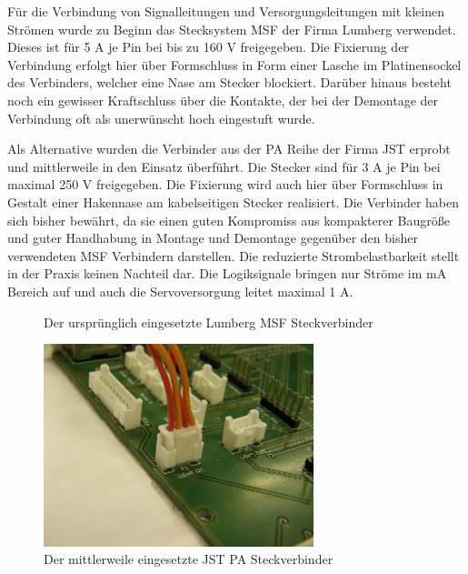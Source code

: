 Für die Verbindung von Signalleitungen  und Versorgungsleitungen mit kleinen Strömen wurde zu Beginn das Stecksystem MSF der Firma Lumberg verwendet.
Dieses ist für 5 A je Pin bei bis zu 160 V freigegeben. Die Fixierung der Verbindung erfolgt hier über Formschluss in Form einer Lasche im Platinensockel des Verbinders, welcher eine Nase am Stecker blockiert. Darüber hinaus besteht noch ein gewisser Kraftschluss über die Kontakte, der bei der Demontage der Verbindung oft als unerwünscht hoch eingestuft wurde.

Als Alternative wurden die Verbinder aus der PA Reihe der Firma JST erprobt und mittlerweile in den Einsatz überführt.
Die Stecker sind für 3 A je Pin bei maximal 250 V freigegeben.
Die Fixierung wird auch hier über Formschluss in Gestalt einer Hakennase am kabelseitigen Stecker realisiert.
Die Verbinder haben sich bisher bewährt, da sie einen guten Kompromiss aus kompakterer Baugröße und guter Handhabung in Montage und Demontage gegenüber den bisher verwendeten MSF Verbindern darstellen.
Die reduzierte Strombelastbarkeit stellt in der Praxis keinen Nachteil dar. Die Logiksignale bringen nur Ströme im mA Bereich auf und auch die Servoversorgung leitet maximal 1 A.

\begin{figure}[H]
\centering
{}
\caption{Der ursprünglich eingesetzte Lumberg MSF Steckverbinder} 
\label{fig:Der ursprünglich eingesetzte Lumberg MSF Steckverbinder}
\end{figure}

\begin{figure}[H]
\centering
\includegraphics[width=0.7\textwidth]{bilder/Stecker/Stecker_JST_PA.jpg} 
\caption{Der mittlerweile eingesetzte JST PA Steckverbinder} 
\label{fig:Der mittlerweile eingesetzte JST PA Steckverbinder}
\end{figure}

